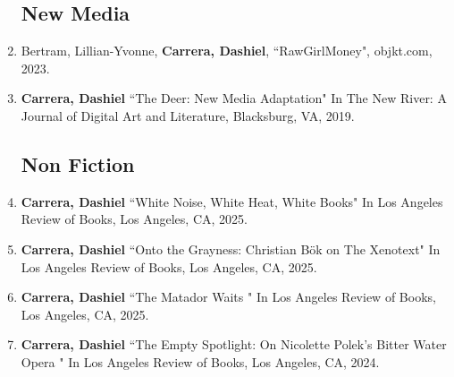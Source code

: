 \begin{enumerate}
\subsection{New Media}
\item Bertram, Lillian-Yvonne, \textbf{Carrera, Dashiel}, ``RawGirlMoney", objkt.com, 2023.
\item \textbf{Carrera, Dashiel} ``The Deer: New Media Adaptation" In The New River: A Journal of Digital Art and Literature, Blacksburg, VA, 2019.\\

\subsection{Non Fiction}

\item \textbf{Carrera, Dashiel} ``White Noise, White Heat, White Books" In Los Angeles Review of Books, Los Angeles, CA, 2025.\\

\item \textbf{Carrera, Dashiel} ``Onto the Grayness: Christian B\"ok on The Xenotext" In Los Angeles Review of Books, Los Angeles, CA, 2025.\\

\item \textbf{Carrera, Dashiel} ``The Matador Waits " In Los Angeles Review of Books, Los Angeles, CA, 2025.\\

\item \textbf{Carrera, Dashiel} ``The Empty Spotlight: On Nicolette Polek's Bitter Water Opera " In Los Angeles Review of Books, Los Angeles, CA, 2024.\\


\end{enumerate}
